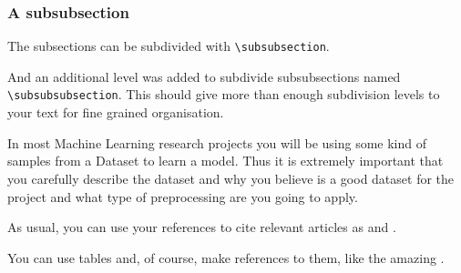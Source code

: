 \documentclass{project-logbook}
\begin{document}
		\subsubsection{A subsubsection}
			The subsections can be subdivided with \texttt{\textbackslash subsubsection}.

				And an additional level was added to subdivide subsubsections named \texttt{\textbackslash subsubsubsection}. This should give more than enough subdivision levels to your text for fine grained organisation.

				\begin{HighlightedNote}{}
					In most Machine Learning research projects you will be using some kind of samples from a Dataset to learn a model. Thus it is extremely important that you carefully describe the dataset and why you believe is a good dataset for the project and what type of preprocessing are you going to apply.
				\end{HighlightedNote}

				As usual, you can use your references to cite relevant articles as \cite{einstein} and \cite{knuth-fa}.

				You can use tables and, of course, make references to them, like the amazing .
\end{document}
